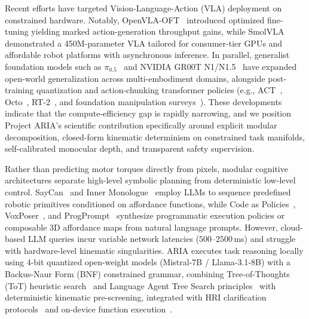 \documentclass[journal]{IEEEtran}
\begin{document}
Recent efforts have targeted Vision-Language-Action (VLA) deployment on constrained hardware. Notably, OpenVLA-OFT~\cite{openvla_oft_2025} introduced optimized fine-tuning yielding marked action-generation throughput gains, while SmolVLA~\cite{smolvla_2025} demonstrated a 450M-parameter VLA tailored for consumer-tier GPUs and affordable robot platforms with asynchronous inference. In parallel, generalist foundation models such as $\pi_{0.5}$~\cite{pi05_2025} and NVIDIA GR00T N1/N1.5~\cite{groot_n1_2025} have expanded open-world generalization across multi-embodiment domains, alongside post-training quantization and action-chunking transformer policies (e.g., ACT~\cite{zhao2023learning}, Octo~\cite{aria_019_ghosh_2024_octo}, RT-2~\cite{zitkovich2023rt2}, and foundation manipulation surveys~\cite{firoozi2023foundation}). These developments indicate that the compute-efficiency gap is rapidly narrowing, and we position Project ARIA's scientific contribution specifically around explicit modular decomposition, closed-form kinematic determinism on constrained task manifolds, self-calibrated monocular depth, and transparent safety supervision.

Rather than predicting motor torques directly from pixels, modular cognitive architectures separate high-level symbolic planning from deterministic low-level control. SayCan~\cite{aria_054_ahn_2022_do} and Inner Monologue~\cite{huang2022inner} employ LLMs to sequence predefined robotic primitives conditioned on affordance functions, while Code as Policies~\cite{liang2023code}, VoxPoser~\cite{huang2023voxposer}, and ProgPrompt~\cite{singh2023progprompt} synthesize programmatic execution policies or composable 3D affordance maps from natural language prompts. However, cloud-based LLM queries incur variable network latencies ($500\text{--}2500$\,ms) and struggle with hardware-level kinematic singularities. ARIA executes task reasoning locally using 4-bit quantized open-weight models (Mistral-7B / Llama-3.1-8B) with a Backus-Naur Form (BNF) constrained grammar, combining Tree-of-Thoughts (ToT) heuristic search~\cite{aria_132_yao_2023_tree} and Language Agent Tree Search principles~\cite{aria_080_zhou_2024_language} with deterministic kinematic pre-screening, integrated with HRI clarification protocols~\cite{aria_039_doan_2022_asking} and on-device function execution~\cite{aria_130_erdogan_2024_tinyagent}.
\end{document}
